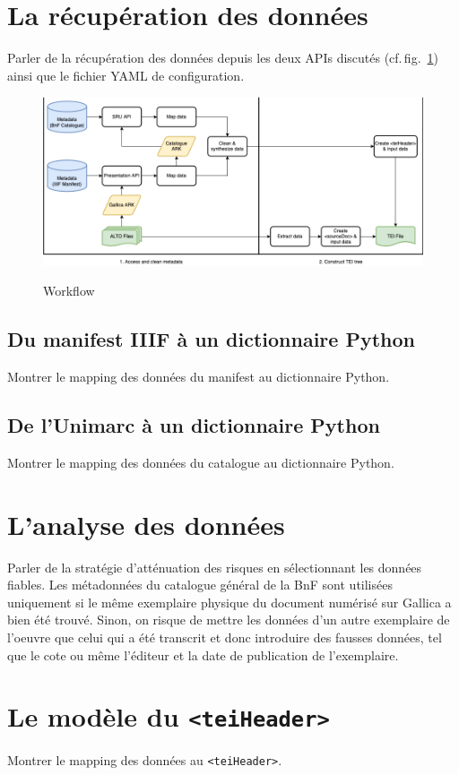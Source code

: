 \documentclass[class=article, crop=false]{standalone}
\begin{document}
\section{La récupération des données}

Parler de la récupération des données depuis les deux APIs discutés (cf.\,fig.~\ref{fig:workflow}) ainsi que le fichier YAML de configuration.

\begin{figure}
\centering
\includegraphics[width=\textwidth]{../../../images/full_tree.png}
\label{fig:workflow}
\caption{Workflow}
\end{figure}

\subsection{Du manifest IIIF à un dictionnaire Python}

Montrer le mapping des données du manifest au dictionnaire Python.

\subsection{De l'Unimarc à un dictionnaire Python}

Montrer le mapping des données du catalogue au dictionnaire Python.

\section{L'analyse des données}

Parler de la stratégie d'atténuation des risques en sélectionnant les données fiables. Les métadonnées du catalogue général de la BnF sont utilisées uniquement si le même exemplaire physique du document numérisé sur Gallica a bien été trouvé. Sinon, on risque de mettre les données d'un autre exemplaire de l'oeuvre que celui qui a été transcrit et donc introduire des fausses données, tel que le cote ou même l'éditeur et la date de publication de l'exemplaire.

\section{Le modèle du \texttt{<teiHeader>}}

Montrer le mapping des données au \texttt{<teiHeader>}.
\end{document}
